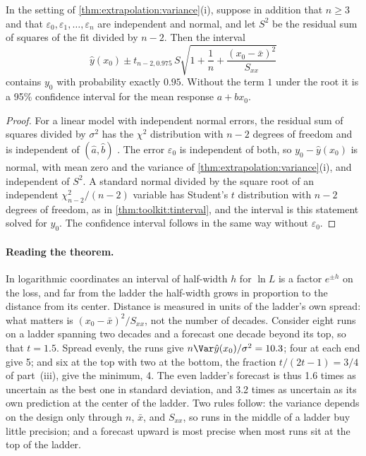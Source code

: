 \begin{refsection}
\begin{corollary}\label{cor:extrapolation:interval}
In the setting of \cref{thm:extrapolation:variance}(i), suppose in addition that $n\ge3$ and that $\varepsilon_0,\varepsilon_1,\dots,\varepsilon_n$ are independent and normal, and let $S^2$ be the residual sum of squares of the fit divided by $n-2$. Then the interval
\[
\hat y(x_0)\pm t_{n-2,0.975}\,S\sqrt{1+\frac1n+\frac{(x_0-\bar x)^2}{S_{xx}}}
\]
contains $y_0$ with probability exactly $0.95$. Without the term $1$ under the root it is a 95\% confidence interval for the mean response $a+bx_0$.
\end{corollary}

\begin{proof}
For a linear model with independent normal errors, the residual sum of squares divided by $\sigma^2$ has the $\chi^2$ distribution with $n-2$ degrees of freedom and is independent of $(\hat a,\hat b)$ \parencite{SeberLee2003}. The error $\varepsilon_0$ is independent of both, so $y_0-\hat y(x_0)$ is normal, with mean zero and the variance of \cref{thm:extrapolation:variance}(i), and independent of $S^2$. A standard normal divided by the square root of an independent $\chi^2_{n-2}/(n-2)$ variable has Student's $t$ distribution with $n-2$ degrees of freedom, as in \cref{thm:toolkit:tinterval}, and the interval is this statement solved for $y_0$. The confidence interval follows in the same way without $\varepsilon_0$.
\end{proof}

\paragraph{Reading the theorem.} In logarithmic coordinates an interval of half-width $h$ for $\ln L$ is a factor $e^{\pm h}$ on the loss, and far from the ladder the half-width grows in proportion to the distance from its center. Distance is measured in units of the ladder's own spread: what matters is $(x_0-\bar x)^2/S_{xx}$, not the number of decades. Consider eight runs on a ladder spanning two decades and a forecast one decade beyond its top, so that $t=1.5$. Spread evenly, the runs give $n\Var\hat y(x_0)/\sigma^2=10.3$; four at each end give 5; and six at the top with two at the bottom, the fraction $t/(2t-1)=3/4$ of part~(iii), give the minimum, 4. The even ladder's forecast is thus 1.6 times as uncertain as the best one in standard deviation, and 3.2 times as uncertain as its own prediction at the center of the ladder. Two rules follow: the variance depends on the design only through $n$, $\bar x$, and $S_{xx}$, so runs in the middle of a ladder buy little precision; and a forecast upward is most precise when most runs sit at the top of the ladder.


\end{refsection}
